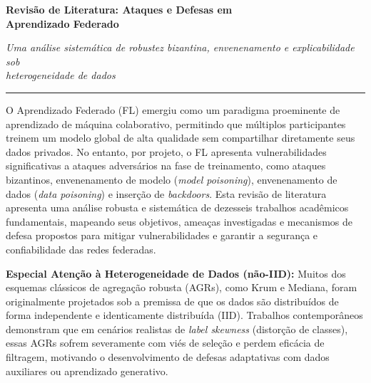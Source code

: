 \documentclass[11pt,a4paper]{article}
\begin{document}
\begin{center}
  {\LARGE \bfseries Revisão de Literatura: Ataques e Defesas em\\[0.3em] Aprendizado Federado}

  \vspace{0.8em}

  {\large \itshape Uma análise sistemática de robustez bizantina, envenenamento e explicabilidade sob\\[0.3em] heterogeneidade de dados}

  \vspace{0.6em}
  \rule{\textwidth}{0.8pt}
  \vspace{1.2em}
\end{center}

O Aprendizado Federado (FL) emergiu como um paradigma proeminente de aprendizado de máquina colaborativo, permitindo que múltiplos participantes treinem um modelo global de alta qualidade sem compartilhar diretamente seus dados privados. No entanto, por projeto, o FL apresenta vulnerabilidades significativas a ataques adversários na fase de treinamento, como ataques bizantinos, envenenamento de modelo (\emph{model poisoning}), envenenamento de dados (\emph{data poisoning}) e inserção de \emph{backdoors}. Esta revisão de literatura apresenta uma análise robusta e sistemática de dezesseis trabalhos acadêmicos fundamentais, mapeando seus objetivos, ameaças investigadas e mecanismos de defesa propostos para mitigar vulnerabilidades e garantir a segurança e confiabilidade das redes federadas.

\vspace{1.2em}

\begin{tcolorbox}[colback=boxdestaque, colframe=boxborda, boxrule=0.8pt, arc=2pt, left=0.6cm, right=0.6cm, top=0.8em, bottom=0.8em]
\textbf{Especial Atenção à Heterogeneidade de Dados (não-IID):} Muitos dos esquemas clássicos de agregação robusta (AGRs), como Krum e Mediana, foram originalmente projetados sob a premissa de que os dados são distribuídos de forma independente e identicamente distribuída (IID). Trabalhos contemporâneos demonstram que em cenários realistas de \emph{label skewness} (distorção de classes), essas AGRs sofrem severamente com viés de seleção e perdem eficácia de filtragem, motivando o desenvolvimento de defesas adaptativas com dados auxiliares ou aprendizado generativo.
\end{tcolorbox}
\end{document}
